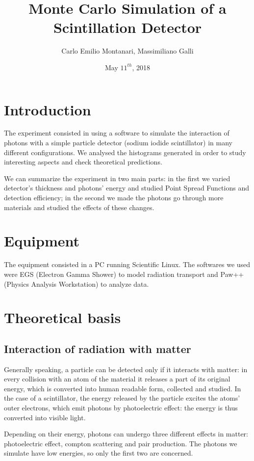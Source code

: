 \documentclass[a4paper]{article}
\begin{document}
\title{Monte Carlo Simulation of a Scintillation Detector}
\author{Carlo Emilio Montanari, Massimiliano Galli}
\date{May $11^{th}$, 2018}
\maketitle

\section{Introduction}
The experiment consisted in using a software to simulate the interaction of photons with a simple particle detector (sodium iodide scintillator) in many different configurations. We analysed the histograms generated in order to study interesting aspects and check theoretical predictions.

We can summarize the experiment in two main parts: in the first we varied detector's thickness and photons' energy and studied Point Spread Functions and detection efficiency; in the second we made the photons go through more materials and studied the effects of these changes.

\section{Equipment}
The equipment consisted in a PC running Scientific Linux. The softwares we used were EGS (Electron Gamma Shower) to model radiation transport and Paw++ (Physics Analysis Workstation) to analyze data.

\section{Theoretical basis}
\subsection{Interaction of radiation with matter}
Generally speaking, a particle can be detected only if it interacts with matter: in every collision with an atom of the material it releases a part of its original energy, which is converted into human readable form, collected and studied. In the case of a scintillator, the energy released by the particle excites the atoms' outer electrons, which emit photons by photoelectric effect: the energy is thus converted into visible light.

Depending on their energy, photons can undergo three different effects in matter: photoelectric effect, compton scattering and pair production. The photons we simulate have low energies, so only the first two are concerned.
\end{document}
